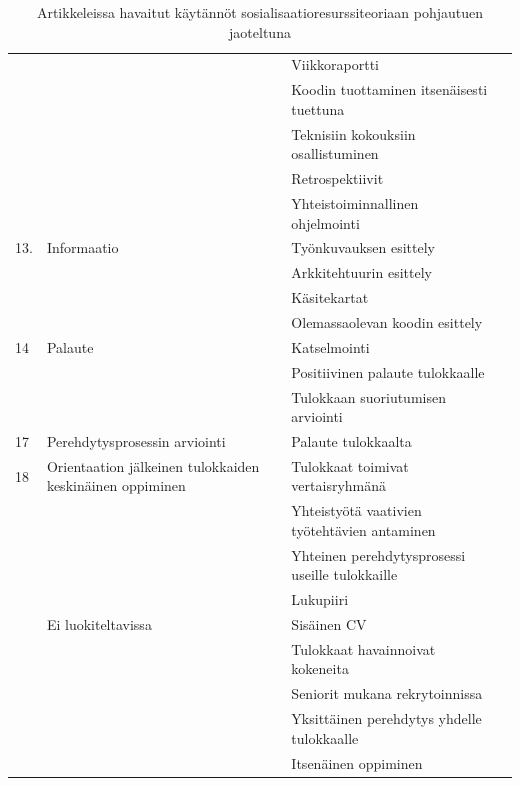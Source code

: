 \documentclass[utf8]{gradu3}
\begin{document}
\begin{table}[h]
\begin{tabular}{llll}
        & & Viikkoraportti \\
        & & Koodin tuottaminen itsenäisesti tuettuna\\
        & & Teknisiin kokouksiin osallistuminen\\
        & & Retrospektiivit\\
        & & Yhteistoiminnallinen ohjelmointi\\
        \midrule
        13. & Informaatio & Työnkuvauksen esittely\\
        & & Arkkitehtuurin esittely\\
        & & Käsitekartat\\
        & & Olemassaolevan koodin esittely\\
        \midrule
        14 & Palaute & Katselmointi \\
        & & Positiivinen palaute tulokkaalle\\
        & & Tulokkaan suoriutumisen arviointi\\
        \midrule
        17 & Perehdytysprosessin arviointi & Palaute tulokkaalta\\
        \midrule
        18 & Orientaation jälkeinen tulokkaiden keskinäinen oppiminen & Tulokkaat toimivat vertaisryhmänä\\
        & & Yhteistyötä vaativien työtehtävien antaminen \\
        & & Yhteinen perehdytysprosessi useille tulokkaille\\
        & & Lukupiiri\\
        \midrule
        & Ei luokiteltavissa & Sisäinen CV \\
        & & Tulokkaat havainnoivat kokeneita\\
        & & Seniorit mukana rekrytoinnissa\\
        & & Yksittäinen perehdytys yhdelle tulokkaalle \\
        & & Itsenäinen oppiminen\\
        \bottomrule
    \end{tabular}
    \caption{Artikkeleissa havaitut käytännöt sosialisaatioresurssiteoriaan \parencite{saks-gruman-2012} pohjautuen jaoteltuna}
    \label{tbl:srt-ulottuvuudet-ja-niiden-kaytannot}
\end{table}
\end{document}
